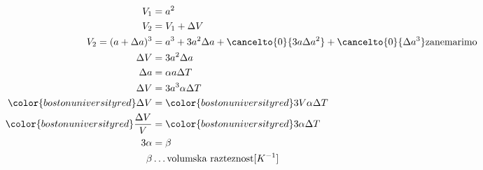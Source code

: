 \begin{enumerate}
		\begin{align*}
			V_1 &= a^2\\
			V_2 &= V_1 + \Delta V\\
			V_2 = (a+\Delta a)^3 &= a^3 + 3a^2\Delta a + \cancelto{0}{3a\Delta a^2} +\cancelto{0}{\Delta a^3} \text{zanemarimo}\\
			\Delta V &= 3a^2\Delta a\\
			\Delta a &= \alpha a \Delta T\\
			\Delta V &= 3a^3\alpha \Delta T\\
			{\color{bostonuniversityred}\Delta V} &= {\color{bostonuniversityred}3V\alpha \Delta T}\\
			{\color{bostonuniversityred}\frac{\Delta V}{V}} &= {\color{bostonuniversityred}3\alpha \Delta T}\\
			3\alpha &= \beta\\
			\beta &\dots \text{volumska razteznost}[K^{-1}]\\
		\end{align*}	
\end{enumerate}